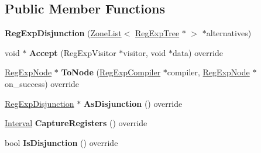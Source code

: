 \subsection*{Public Member Functions}
\begin{DoxyCompactItemize}
\item 
{\bfseries Reg\+Exp\+Disjunction} (\hyperlink{classv8_1_1internal_1_1_zone_list}{Zone\+List}$<$ \hyperlink{classv8_1_1internal_1_1_reg_exp_tree}{Reg\+Exp\+Tree} $\ast$ $>$ $\ast$alternatives)\hypertarget{classv8_1_1internal_1_1_reg_exp_disjunction_a24ac89d3219d734907ee7341a03ed968}{}\label{classv8_1_1internal_1_1_reg_exp_disjunction_a24ac89d3219d734907ee7341a03ed968}

\item 
void $\ast$ {\bfseries Accept} (Reg\+Exp\+Visitor $\ast$visitor, void $\ast$data) override\hypertarget{classv8_1_1internal_1_1_reg_exp_disjunction_a666bbc4efa67dc6b6cb2b3195a81718d}{}\label{classv8_1_1internal_1_1_reg_exp_disjunction_a666bbc4efa67dc6b6cb2b3195a81718d}

\item 
\hyperlink{classv8_1_1internal_1_1_reg_exp_node}{Reg\+Exp\+Node} $\ast$ {\bfseries To\+Node} (\hyperlink{classv8_1_1internal_1_1_reg_exp_compiler}{Reg\+Exp\+Compiler} $\ast$compiler, \hyperlink{classv8_1_1internal_1_1_reg_exp_node}{Reg\+Exp\+Node} $\ast$on\+\_\+success) override\hypertarget{classv8_1_1internal_1_1_reg_exp_disjunction_afdf2e65b80e7ee45e633c37d90f2a38a}{}\label{classv8_1_1internal_1_1_reg_exp_disjunction_afdf2e65b80e7ee45e633c37d90f2a38a}

\item 
\hyperlink{classv8_1_1internal_1_1_reg_exp_disjunction}{Reg\+Exp\+Disjunction} $\ast$ {\bfseries As\+Disjunction} () override\hypertarget{classv8_1_1internal_1_1_reg_exp_disjunction_ac6f196bb8944cbfa390049ea17babad5}{}\label{classv8_1_1internal_1_1_reg_exp_disjunction_ac6f196bb8944cbfa390049ea17babad5}

\item 
\hyperlink{classv8_1_1internal_1_1_interval}{Interval} {\bfseries Capture\+Registers} () override\hypertarget{classv8_1_1internal_1_1_reg_exp_disjunction_a77966596119fee9bbdaff5d0e267e0b2}{}\label{classv8_1_1internal_1_1_reg_exp_disjunction_a77966596119fee9bbdaff5d0e267e0b2}

\item 
bool {\bfseries Is\+Disjunction} () override\hypertarget{classv8_1_1internal_1_1_reg_exp_disjunction_addbeaff24ecb4b52e27f26694e270e97}{}\label{classv8_1_1internal_1_1_reg_exp_disjunction_addbeaff24ecb4b52e27f26694e270e97}


\end{DoxyCompactItemize}
